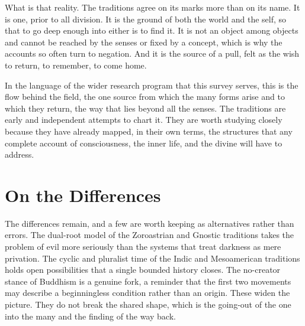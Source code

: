 What is that reality. The traditions agree on its marks more than on its name. It is one, prior to all
division. It is the ground of both the world and the self, so that to go deep enough into either is to find
it. It is not an object among objects and cannot be reached by the senses or fixed by a concept, which is why
the accounts so often turn to negation. And it is the source of a pull, felt as the wish to return, to
remember, to come home.

In the language of the wider research program that this survey serves, this is the flow behind the field, the
one source from which the many forms arise and to which they return, the way that lies beyond all the senses.
The traditions are early and independent attempts to chart it. They are worth studying closely because they
have already mapped, in their own terms, the structures that any complete account of consciousness, the
inner life, and the divine will have to address.

\section{On the Differences}

The differences remain, and a few are worth keeping as alternatives rather than errors. The dual-root model
of the Zoroastrian and Gnostic traditions takes the problem of evil more seriously than the systems that
treat darkness as mere privation. The cyclic and pluralist time of the Indic and Mesoamerican traditions
holds open possibilities that a single bounded history closes. The no-creator stance of Buddhism is a
genuine fork, a reminder that the first two movements may describe a beginningless condition rather than an
origin. These widen the picture. They do not break the shared shape, which is the going-out of the one into
the many and the finding of the way back.
